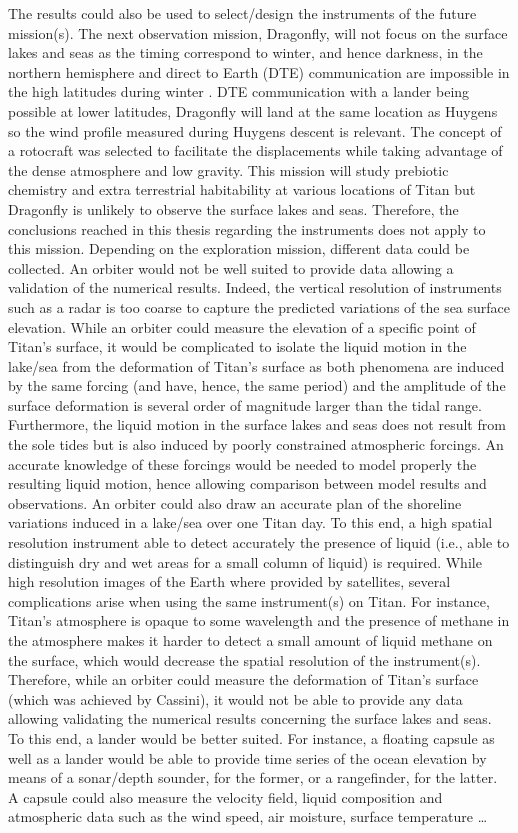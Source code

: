 The results could also be used to select/design the instruments of the future mission(s). The next observation mission, Dragonfly, will not focus on the surface lakes and seas as the timing correspond to winter, and hence darkness, in the northern hemisphere and direct to Earth (DTE) communication are impossible in the high latitudes during winter \citep{lorenz2018dragonfly}. DTE communication with a lander being possible at lower latitudes, Dragonfly will land at the same location as Huygens so the wind profile measured during Huygens descent is relevant. The concept of a rotocraft was selected to facilitate the displacements while taking advantage of the dense atmosphere and low gravity. This mission will study prebiotic chemistry and extra terrestrial habitability at various locations of Titan but Dragonfly is unlikely to observe the surface lakes and seas. Therefore, the conclusions reached in this thesis regarding the instruments does not apply to this mission. Depending on the exploration mission, different data could be collected. An orbiter would not be well suited to provide data allowing a validation of the numerical results. Indeed, the vertical resolution of instruments such as a radar is too coarse to capture the predicted variations of the sea surface elevation. While an orbiter could measure the elevation of a specific point of Titan's surface, it would be complicated to isolate the liquid motion in the lake/sea from the deformation of Titan's surface as both phenomena are induced by the same forcing (and have, hence, the same period) and the amplitude of the surface deformation is several order of magnitude larger than the tidal range. Furthermore, the liquid motion in the surface lakes and seas does not result from the sole tides but is also induced by poorly constrained atmospheric forcings. An accurate knowledge of these forcings would be needed to model properly the resulting liquid motion, hence allowing comparison between model results and observations. An orbiter could also draw an accurate plan of the shoreline variations induced in a lake/sea over one Titan day. To this end, a high spatial resolution instrument able to detect accurately the presence of liquid (i.e., able to distinguish dry and wet areas for a small column of liquid) is required. While high resolution images of the Earth where provided by satellites, several complications arise when using the same instrument(s) on Titan. For instance, Titan's atmosphere is opaque to some wavelength and the presence of methane in the atmosphere makes it harder to detect a small amount of liquid methane on the surface, which would decrease the spatial resolution of the instrument(s). Therefore, while an orbiter could measure the deformation of Titan's surface (which was achieved by Cassini), it would not be able to provide any data allowing validating the numerical results concerning the surface lakes and seas. To this end, a lander would be better suited. For instance, a floating capsule as well as a lander would be able to provide time series of the ocean elevation by means of a sonar/depth sounder, for the former, or a rangefinder, for the latter. A capsule could also measure the velocity field, liquid composition and atmospheric data such as the wind speed, air moisture, surface temperature \dots 